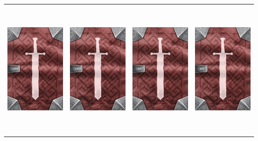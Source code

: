 \documentclass{minimal}
\begin{document}
{\begin{longtable}{llll}
\includegraphics[width=44mm,height=68mm]{./1-14/gh-008-heater-shield-back.png} &
\includegraphics[width=44mm,height=68mm]{./1-14/gh-008-heater-shield-back.png} &
\includegraphics[width=44mm,height=68mm]{./1-14/gh-007-iron-helmet-back.png} &
\includegraphics[width=44mm,height=68mm]{./1-14/gh-007-iron-helmet-back.png}\\ 

\end{longtable}}
\end{document}
